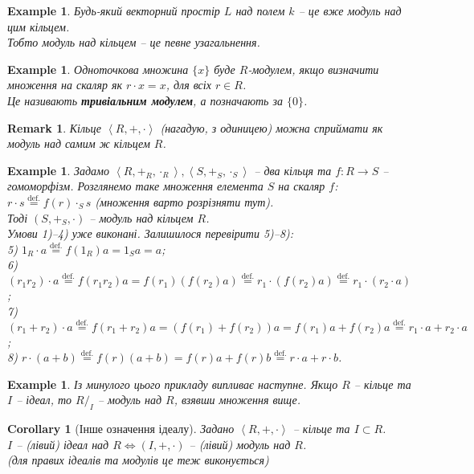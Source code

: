\documentclass[a4paper, 10pt]{article}
\theoremstyle{theoremdd}
\theoremstyle{theoremdd}
\theoremstyle{theoremdd}
\theoremstyle{theoremdd}
\theoremstyle{theoremdd}
\newtheorem{example}[theorem]{Example}
\theoremstyle{theoremdd}
\theoremstyle{theoremdd}
\theoremstyle{theoremdd}
\theoremstyle{theoremdd}
\theoremstyle{theoremdd}
\theoremstyle{theoremdd}
\newtheorem{remark}[theorem]{Remark}
\theoremstyle{theoremdd}
\theoremstyle{theoremdd}
\theoremstyle{theoremdd}
\newtheorem{corollary}[theorem]{Corollary}
\theoremstyle{theoremdd}
\newcommand{\eqbydef}{\overset{\text{def.}}{=}}
\begin{document}
\begin{example}
Будь-який векторний простір $L$ над полем $k$ -- це вже модуль над цим кільцем.\\
Тобто модуль над кільцем -- це певне узагальнення.
\end{example}

\begin{example}
Одноточкова множина $\{x\}$ буде $R$-модулем, якщо визначити множення на скаляр як $r \cdot x = x$, для всіх $r \in R$.\\
Це називають \textbf{тривіальним модулем}, а позначають за $\{0\}$.
\end{example}

\begin{remark}
Кільце $\left<R,+,\cdot\right>$ (нагадую, з одиницею) можна сприймати як модуль над самим ж кільцем $R$.
\end{remark}

\begin{example}
Задамо $\left<R,+_R,\cdot_R\right>,\left<S,+_S,\cdot_S\right>$ -- два кільця та $f \colon R \to S$ -- гомоморфізм. Розглянемо таке множення елемента $S$ на скаляр $f$:\\
$r \cdot s \eqbydef f(r) \cdot_S s$ (множення варто розрізняти тут).\\
Тоді $(S,+_S,\cdot)$ -- модуль над кільцем $R$.\\
Умови 1)--4) уже виконані. Залишилося перевірити 5)--8):\\
5) $1_R \cdot a \eqbydef f(1_R) a = 1_S a = a$;\\
6) $(r_1r_2) \cdot a \eqbydef f(r_1r_2)a = f(r_1)(f(r_2)a) \eqbydef r_1 \cdot (f(r_2)a) \eqbydef r_1 \cdot (r_2 \cdot a)$;\\
7) $(r_1+r_2) \cdot a \eqbydef f(r_1+r_2) a = (f(r_1)+f(r_2)) a = f(r_1) a + f(r_2) a \eqbydef r_1 \cdot a + r_2 \cdot a$;\\
8) $r \cdot (a+b) \eqbydef f(r) (a+b) = f(r) a + f(r) b \eqbydef r \cdot a + r \cdot b$.
\end{example}

\begin{example}
Із минулого цього прикладу випливає наступне. Якщо $R$ -- кільце та $I$ -- ідеал, то $R/_I$ -- модуль над $R$, взявши множення вище.
\end{example}

\begin{corollary}[Інше означення ідеалу]
Задано $\left<R,+,\cdot\right>$ -- кільце та $I \subset R$.\\
$I$ -- (лівий) ідеал над $R \iff (I,+,\cdot)$ -- (лівий) модуль над $R$.\\
(для правих ідеалів та модулів це теж виконується)
\end{corollary}
\end{document}
